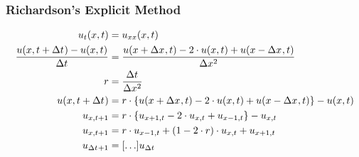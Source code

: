\documentclass[
	final,
	a4paper,
	oneside,
	parskip=full,
	headings=standardclasses,
	headings=big,
	pointednumbers,
    fleqn
]{scrartcl}
\newcommand{\f}[2]{\frac{#1}{#2}}
\newcommand{\kl}[1]{{\left( #1 \right)}}
\newcommand{\kq}[1]{{\left\{ #1 \right\}}}
\newcommand{\ks}[1]{{\left[ #1 \right]}}
\begin{document}
    \subsubsection*{Richardson's Explicit Method}
    
    \begin{align*}
        u_{t}\kl{x,t}                               & = u_{xx}\kl{x,t} \\
        \f{u \kl{x, t + \dt} - u \kl{x, t}}{\dt}    & = \f{u \kl{x + \dx, t} - 2 \cdot u\kl{x, t} + u \kl{x - \dx, t}}{\dx[2]} \\
        r                                           & = \f{\dt}{\dx[2]} \\
        u \kl{x, t + \dt}                           & = r \cdot \kq{u \kl{x + \dx, t} - 2 \cdot u\kl{x, t} + u \kl{x - \dx, t}} - u \kl{x, t} \\
        u_{x,t+1}                                   & = r \cdot \kq{u_{x+1,t} - 2 \cdot u_{x,t} + u_{x-1,t}} - u_{x, t} \\
        u_{x,t+1}                                   & = r \cdot u_{x-1,t} + \kl{1 - 2\cdot r} \cdot u_{x,t} + u_{x+1,t} \\
        u_{\dt + 1} & = \ks{\ldots}  u_{\dt}
    \end{align*}
\end{document}
